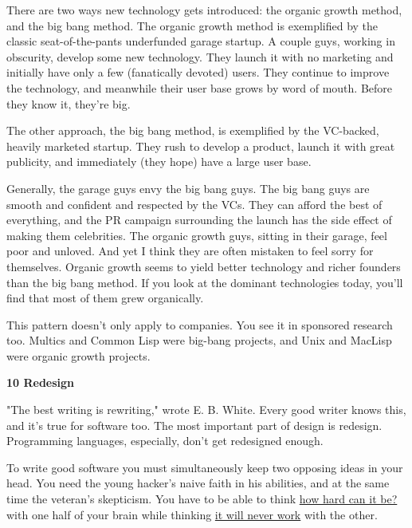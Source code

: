 There are two ways new technology gets
                  introduced: the organic growth method, and the big bang
                  method. The organic growth method is exemplified by the
                  classic seat-of-the-pants underfunded garage startup. A couple
                  guys, working in obscurity, develop some new technology. They
                  launch it with no marketing and initially have only a few
                  (fanatically devoted) users. They continue to improve the
                  technology, and meanwhile their user base grows by word of
                  mouth. Before they know it, they're big.

The other
                  approach, the big bang method, is exemplified by the
                  VC-backed, heavily marketed startup. They rush to develop a
                  product, launch it with great publicity, and immediately (they
                  hope) have a large user base.

Generally, the garage
                  guys envy the big bang guys. The big bang guys are smooth and
                  confident and respected by the VCs. They can afford the best
                  of everything, and the PR campaign surrounding the launch has
                  the side effect of making them celebrities. The organic growth
                  guys, sitting in their garage, feel poor and unloved. And yet
                  I think they are often mistaken to feel sorry for themselves.
                  Organic growth seems to yield better technology and richer
                  founders than the big bang method. If you look at the dominant
                  technologies today, you'll find that most of them grew
                  organically.

This pattern doesn't only apply to
                  companies. You see it in sponsored research too. Multics and
                  Common Lisp were big-bang projects, and Unix and MacLisp were
                  organic growth projects.

\textbf{10 Redesign}

"The best writing is rewriting," wrote E. B.
                  White. Every good writer knows this, and it's true for
                  software too. The most important part of design is redesign.
                  Programming languages, especially, don't get redesigned
                  enough.

To write good software you must
                  simultaneously keep two opposing ideas in your head. You need
                  the young hacker's naive faith in his abilities, and at the
                  same time the veteran's skepticism. You have to be able to
                  think
                  \href{http://www.trevorblackwell.com}{how hard can it be?}
                  with one half of your brain while thinking
                  \href{http://www.pdos.lcs.mit.edu/\textasciitilde{}rtm/}{it will never work}
                  with the other.

